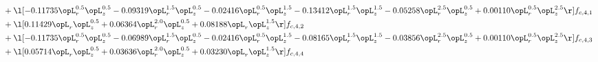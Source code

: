 \begin{alignat}{2}
& + \l[  -0.11735 \opL_r^{0.5} \opL_z^{0.5}   -0.09319 \opL_r^{1.5} \opL_z^{0.5}   -0.02416 \opL_r^{0.5} \opL_z^{1.5}   -0.13412 \opL_r^{1.5} \opL_z^{1.5}   -0.05258 \opL_r^{2.5} \opL_z^{0.5} +  0.00110 \opL_r^{0.5} \opL_z^{2.5}  \r] f_{c,4,1} \nonumber \\ 
& + \l[  0.11429 \opL_r \opL_z^{0.5} +  0.06364 \opL_r^{2.0} \opL_z^{0.5} +  0.08188 \opL_r \opL_z^{1.5}  \r] f_{c,4,2} \nonumber \\ 
& + \l[  -0.11735 \opL_r^{0.5} \opL_z^{0.5}   -0.06989 \opL_r^{1.5} \opL_z^{0.5}   -0.02416 \opL_r^{0.5} \opL_z^{1.5}   -0.08165 \opL_r^{1.5} \opL_z^{1.5}   -0.03856 \opL_r^{2.5} \opL_z^{0.5} +  0.00110 \opL_r^{0.5} \opL_z^{2.5}  \r] f_{c,4,3} \nonumber \\ 
& + \l[  0.05714 \opL_r \opL_z^{0.5} +  0.03636 \opL_r^{2.0} \opL_z^{0.5} +  0.03230 \opL_r \opL_z^{1.5}  \r] f_{c,4,4} \nonumber \\ 
\end{alignat} 


